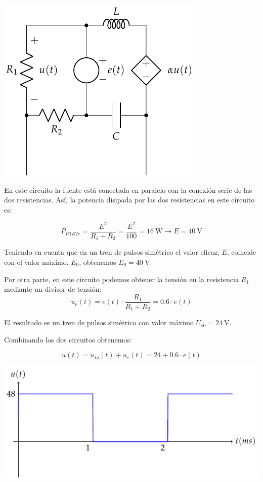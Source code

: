 \documentclass[12pt]{article}
\begin{document}
\begin{center}
  \includegraphics{../figs/superposicion3_fuentepulsos}
\end{center}

En este circuito la fuente está conectada en paralelo con la conexión serie de las dos resistencias. Así, la potencia disipada por las dos resistencias en este circuito es:

\begin{equation*}
  P_{R1R2e} = \frac{E^2}{R_1 + R_2} = \frac{E^2}{100} = \SI{16}{\watt} \rightarrow E = \SI{40}{\volt}
\end{equation*}

Teniendo en cuenta que en un tren de pulsos simétrico el valor eficaz, $E$, coincide con el valor máximo, $E_0$, obtenemos $E_0 = \SI{40}{\volt}$.

Por otra parte, en este circuito podemos obtener la tensión en la resistencia $R_1$ mediante un divisor de tensión:
\begin{equation*}
  u_e(t) = e(t) \cdot \frac{R_1}{R_1 + R_2} = 0.6\cdot e(t)
\end{equation*}

El resultado es un tren de pulsos simétrico con valor máximo $U_{e0} = \SI{24}{\volt}$.

Combinando los dos circuitos obtenemos:

\begin{equation*}
  u(t) = u_{Ig}(t) + u_e(t) = 24 + 0.6 \cdot e(t)
\end{equation*}

\begin{center}
  \includegraphics{../figs/superposicionOndaCuadrada2}
\end{center}
\end{document}
